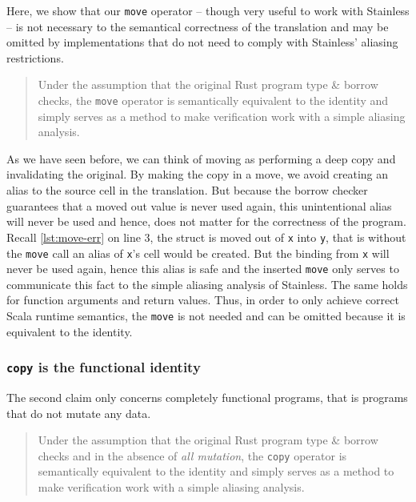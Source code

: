 Here, we show that our \passthrough{\lstinline!move!} operator --
though very useful to work with Stainless -- is not necessary to the
semantical correctness of the translation and may be omitted by implementations
that do not need to comply with Stainless' aliasing restrictions.

\begin{quote}
Under the assumption that the original Rust program type \& borrow
checks, the \passthrough{\lstinline!move!} operator is semantically
equivalent to the identity and simply serves as a method to make
verification work with a simple aliasing analysis.
\end{quote}

As we have seen before, we can think of moving as performing a deep copy and
invalidating the original. By making the copy in a move, we avoid creating an
alias to the source cell in the translation. But because the borrow checker
guarantees that a moved out value is never used again, this unintentional alias
will never be used and hence, does not matter for the correctness of the
program. Recall \autoref{lst:move-err} on line 3, the struct is moved out of
\passthrough{\lstinline!x!} into \passthrough{\lstinline!y!}, that is without
the \passthrough{\lstinline!move!} call an alias of
\passthrough{\lstinline!x!}'s cell would be created. But the binding from
\passthrough{\lstinline!x!} will never be used again, hence this alias is safe
and the inserted \passthrough{\lstinline!move!} only serves to communicate this
fact to the simple aliasing analysis of Stainless. The same holds for function
arguments and return values. Thus, in order to only achieve correct Scala
runtime semantics, the \passthrough{\lstinline!move!} is not needed and can be
omitted because it is equivalent to the identity.

\subsubsection{\texorpdfstring{\texttt{copy} is the functional
identity}{copy is the functional identity}}

The second claim only concerns completely functional programs, that is
programs that do not mutate any data.

\begin{quote}
Under the assumption that the original Rust program type \& borrow
checks and in the absence of \emph{all mutation}, the
\passthrough{\lstinline!copy!} operator is semantically equivalent to
the identity and simply serves as a method to make verification work
with a simple aliasing analysis.
\end{quote}

